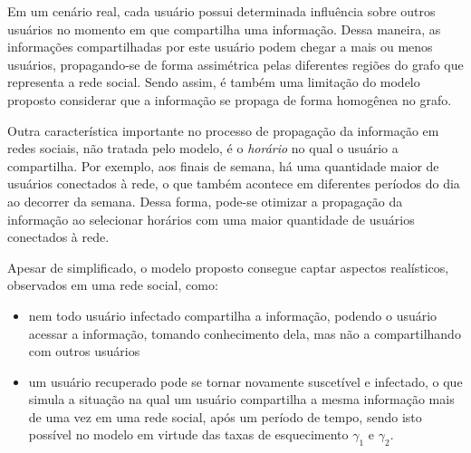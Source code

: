 \documentclass[
	12pt,				%
	openright,			%
	oneside,			%
	a4paper,			%
	english,			%
	french,				%
	spanish,			%
	brazil				%
	]{abntex2}
\begin{document}
Em um cenário real, cada usuário possui determinada influência sobre
outros usuários no momento em que compartilha uma informação.  Dessa
maneira, as informações compartilhadas por este usuário podem chegar a
mais ou menos usuários, propagando-se de forma assimétrica pelas
diferentes regiões do grafo que representa a rede social.  Sendo
assim, é também uma limitação do modelo proposto considerar que a
informação se propaga de forma homogênea no grafo.

Outra característica importante no processo de propagação da
informação em redes sociais, não tratada pelo modelo, é o
\emph{horário} no qual o usuário a compartilha.  Por exemplo, aos
finais de semana, há uma quantidade maior de usuários conectados à
rede, o que também acontece em diferentes períodos do dia ao decorrer
da semana.  Dessa forma, pode-se otimizar a propagação da informação
ao selecionar horários com uma maior quantidade de usuários conectados
à rede.

Apesar de simplificado, o modelo proposto consegue captar
aspectos realísticos, observados em uma rede social, como:

\begin{itemize}
\item nem todo usuário infectado compartilha a informação, podendo o
  usuário acessar a informação, tomando conhecimento dela, mas não
  a compartilhando com outros usuários
\item um usuário recuperado pode se tornar novamente suscetível e
  infectado, o que simula a situação na qual um usuário compartilha a
  mesma informação mais de uma vez em uma rede social, após um período
  de tempo, sendo isto possível no modelo em virtude das taxas de
  esquecimento $\gamma_1$ e $\gamma_2$.
\end{itemize}


\postextual


\end{document}
